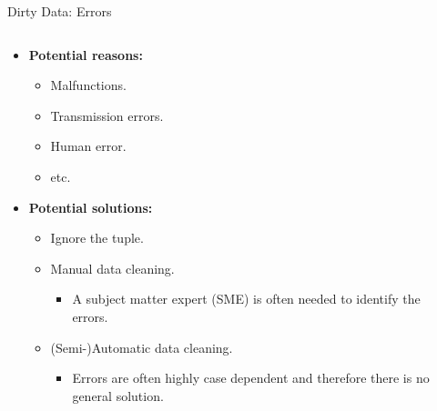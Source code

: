 \begin{frame}{Dirty Data: Errors}
	\begin{columns}
		\begin{column}{0.45\textwidth}
			\begin{itemize}
				\item \textbf{Potential reasons:}
				      \begin{itemize}
					      \item Malfunctions.
					      \item Transmission errors.
					      \item Human error.
					      \item etc.
				      \end{itemize}
				\item \textbf{Potential solutions:}
				      \begin{itemize}
					      \item Ignore the tuple.
					      \item Manual data cleaning.
					            \begin{itemize}
						            \item A subject matter expert (SME) is often needed to
						                  identify the errors.
					            \end{itemize}
					      \item (Semi-)Automatic data cleaning.
					            \begin{itemize}
						            \item Errors are often highly case dependent and therefore there is no general solution.
					            \end{itemize}
				      \end{itemize}
			\end{itemize}
		\end{column}

		\begin{column}{0.45\textwidth}
			\centering

			\vspace*{1cm}

		\end{column}
	\end{columns}
\end{frame}

